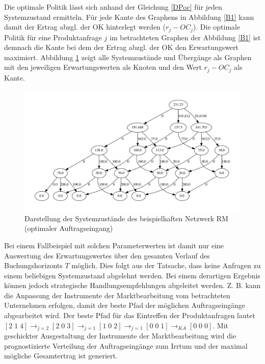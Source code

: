 Die optimale Politik lässt sich anhand der Gleichung \eqref{DPoc} für jeden Systemzustand ermitteln. Für jede Kante des Graphens in Abbildung \ref{B1} kann damit der Ertrag abzgl. der OK hinterlegt werden ($r_{j}-OC_{j}$). Die optimale Politik für eine Produktanfrage $j$ im betrachteten Graphen der Abbildung \ref{B1} ist demnach die Kante bei dem der Ertrag abzgl. der OK den Erwartungswert maximiert. Abbildung \ref{B1a} zeigt alle Systemzustände und Übergänge als Graphen mit den jeweiligen Erwartungswerten als Knoten und den Wert $r_{j}-OC_{j}$ als Kante.
\begin{figure}[h!]
  \begin{center}
    \includegraphics[width=150mm]{Bilder/Beispiel1a.pdf}
    \caption{Darstellung der Systemzustände des beispielhaften Netzwerk RM (optimaler Auftragseingang)}  \label{B1a}
  \end{center}
\end{figure}

Bei einem Fallbeispiel mit solchen Parameterwerten ist damit nur eine Auswertung des Erwartungswertes über den gesamten Verlauf des Buchungshorizonts $T$ möglich. Dies folgt aus der Tatsache, dass keine Anfragen zu einem beliebigen Systemzustand abgelehnt werden. Bei einem derartigen Ergebnis können jedoch strategische Handlungsempfehlungen abgeleitet werden. Z. B. kann die Anpassung der Instrumente der Marktbearbeitung vom betrachteten Unternehmen erfolgen, damit der beste Pfad der möglichen Auftragseingänge abgearbeitet wird. Der beste Pfad für das Eintreffen der Produktanfragen lautet $[2\;1\;4] \rightarrow_{j={2}}[2\;0\;3] \rightarrow_{j={1}}[1\;0\;2]\rightarrow_{j={1}}[0\;0\;1]\rightarrow_{KA}[0\;0\;0]$. Mit geschickter Ausgestaltung der Instrumente der Marktbearbeitung wird die prognostizierte Verteilung der Auftragseingänge zum Irrtum und der maximal mögliche Gesamtertrag ist generiert.

